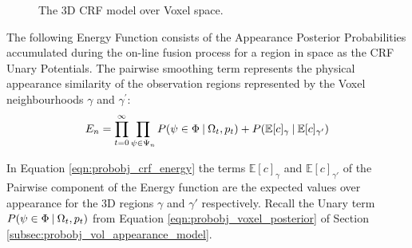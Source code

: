 \begin{figure}[h]
{
  }
  \caption{The 3D CRF model over Voxel space.}
\end{figure}

The following Energy Function consists of the Appearance Posterior Probabilities
accumulated during the on-line fusion process for a region in space as the
CRF Unary Potentials. The pairwise smoothing term represents the physical
appearance similarity of the observation regions represented by the
Voxel neighbourhoods $\gamma$ and $\gamma^{'}$:
\begin{equation}
  \label{eqn:probobj_crf_energy}
  E_{n} = \prod_{t=0}^{\infty} \prod_{\psi \in \Psi_{n}}
  P(\psi \in \Phi \:\vert\: \Omega_{t}, p_{t}) +
  P(\mathbb{E}[c]_{\gamma} \:\vert\: \mathbb{E}[c]_{\gamma'})
\end{equation}

In Equation \ref{eqn:probobj_crf_energy} the terms $\mathbb{E}[c]_{\gamma}$ and
$\mathbb{E}[c]_{\gamma'}$ of the Pairwise component of the Energy function  are
the expected values over appearance for the 3D regions $\gamma$ and $\gamma'$
respectively. Recall the Unary term $P(\psi \in \Phi \:\vert\: \Omega_{t}, p_{t})$
from Equation \ref{eqn:probobj_voxel_posterior} of Section
\ref{subsec:probobj_vol_appearance_model}.

